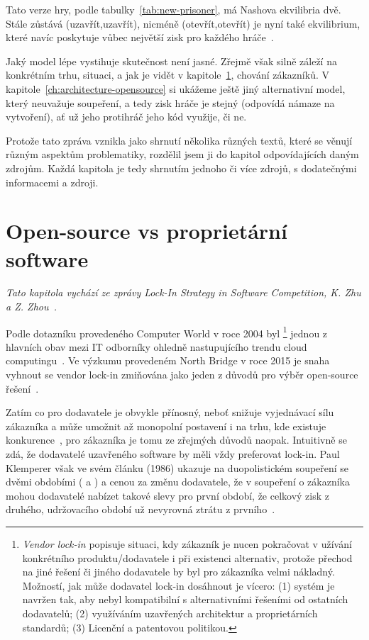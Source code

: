 \begin{multicols}{2}
Tato verze hry, podle tabulky~\ref{tab:new-prisoner}, má Nashova ekvilibria dvě. Stále zůstává (uzavřít,uzavřít), nicméně (otevřít,otevřít) je nyní také ekvilibrium, které navíc poskytuje vůbec největší zisk pro každého hráče~\cite{network-effects-opensource}.

Jaký model lépe vystihuje skutečnost není jasné. Zřejmě však silně záleží na konkrétním trhu, situaci, a jak je vidět v kapitole~\ref{ch:opensource-vs-proprietary}, chování zákazníků. V kapitole~\ref{ch:architecture-opensource} si ukážeme ještě jiný alternativní model, který neuvažuje soupeření, a tedy zisk hráče je stejný (odpovídá námaze na vytvoření), ať už jeho protihráč jeho kód využije, či ne.

Protože tato zpráva vznikla jako shrnutí několika různých textů, které se věnují různým aspektům problematiky, rozdělil jsem ji do kapitol odpovídajících daným zdrojům. Každá kapitola je tedy shrnutím jednoho či více zdrojů, s dodatečnými informacemi a zdroji.




\section{Open-source vs proprietární software}
\label{ch:opensource-vs-proprietary}
	{\em Tato kapitola vychází ze zprávy Lock-In Strategy in Software Competition, K. Zhu a Z. Zhou~\cite{lock-in-competition}.}

	Podle dotazníku provedeného Computer World v roce 2004 byl \footnote{{\em Vendor lock-in} popisuje situaci, kdy zákazník je nucen pokračovat v užívání konkrétního produktu/dodavatele i při existenci alternativ, protože přechod na jiné řešení či jiného dodavatele by byl pro zákazníka velmi nákladný. Možností, jak může dodavatel lock-in dosáhnout je vícero: (1) systém je navržen tak, aby nebyl kompatibilní s alternativními řešeními od ostatních dodavatelů; (2) využíváním uzavřených architektur a proprietárních standardů; (3) Licenční a patentovou politikou.} jednou z hlavních obav mezi IT odborníky ohledně nastupujícího trendu cloud computingu~\cite{computer-world-2004}. Ve výzkumu provedeném North Bridge v roce 2015 je snaha vyhnout se vendor lock-in zmiňována jako jeden z důvodů pro výběr open-source řešení~\cite{survey-2015}.

	Zatím co pro dodavatele je  obvykle přínosný, neboť snižuje
	vyjednávací sílu zákazníka a může umožnit až monopolní postavení i na trhu,
	kde existuje konkurence~\cite[str. 1]{lock-in-competition}, pro zákazníka
	je tomu ze zřejmých důvodů naopak. Intuitivně se zdá, že dodavatelé
	uzavřeného software by měli vždy preferovat lock-in. Paul Klemperer však ve
	svém článku (1986) ukazuje na duopolistickém soupeření se dvěmi obdobími
	( a ) a cenou za změnu dodavatele, že v soupeření o zákazníka mohou dodavatelé nabízet takové slevy pro první období, že celkový zisk z druhého, udržovacího období už nevyrovná ztrátu z prvního~\cite{klemperer-switching-costs,lock-in-competition}.


\end{multicols}

